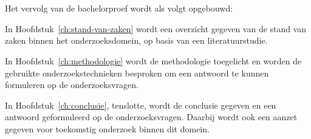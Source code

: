 \section{}
\label{sec:opzet-bachelorproef}


Het vervolg van de bachelorproef wordt als volgt opgebouwd:

In Hoofdstuk~\ref{ch:stand-van-zaken} wordt een overzicht gegeven van de stand van zaken binnen het onderzoeksdomein, op basis van een literatuurstudie.

In Hoofdstuk~\ref{ch:methodologie} wordt de methodologie toegelicht en worden de gebruikte onderzoekstechnieken besproken om een antwoord te kunnen formuleren op de onderzoeksvragen.

In Hoofdstuk~\ref{ch:conclusie}, tenslotte, wordt de conclusie gegeven en een antwoord geformuleerd op de onderzoeksvragen. Daarbij wordt ook een aanzet gegeven voor toekomstig onderzoek binnen dit domein.